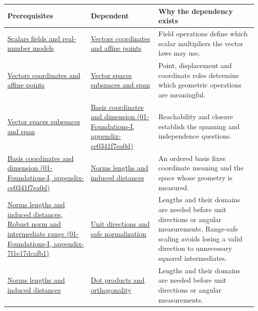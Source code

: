 {\def\LTcaptype{none} %
\begin{longtable}[]{@{}
  >{\raggedright\arraybackslash}p{}
  >{\raggedright\arraybackslash}p{}
  >{\raggedright\arraybackslash}p{}@{}}
\toprule\noalign{}
\begin{minipage}[b]{\linewidth}\raggedright
Prerequisites
\end{minipage} & \begin{minipage}[b]{\linewidth}\raggedright
Dependent
\end{minipage} & \begin{minipage}[b]{\linewidth}\raggedright
Why the dependency exists
\end{minipage} \\
\midrule\noalign{}
\endhead
\bottomrule\noalign{}
\endlastfoot
\hyperref[appendix-52051ad550fe]{Scalars fields and real-number models} & \hyperref[appendix-0659864c0aa3]{Vectors coordinates and affine points} & Field operations define which scalar multipliers the vector laws may use. \\
\hyperref[appendix-0659864c0aa3]{Vectors coordinates and affine points} & \hyperref[appendix-173b52c063ae]{Vector spaces subspaces and span} & Point, displacement and coordinate roles determine which geometric operations are meaningful. \\
\hyperref[appendix-173b52c063ae]{Vector spaces subspaces and span} & \href{}{Basis coordinates and dimension (01-Foundations-I, appendix-ce0341f7ea0d)} & Reachability and closure establish the spanning and independence questions. \\
\href{}{Basis coordinates and dimension (01-Foundations-I, appendix-ce0341f7ea0d)} & \hyperref[appendix-49933872bb51]{Norms lengths and induced distances} & An ordered basis fixes coordinate meaning and the space whose geometry is measured. \\
\hyperref[appendix-49933872bb51]{Norms lengths and induced distances}, \href{}{Robust norm and intermediate range (01-Foundations-I, appendix-7f1e17dcafb1)} & \hyperref[appendix-f744e41b95b4]{Unit directions and safe normalization} & Lengths and their domains are needed before unit directions or angular measurements. Range-safe scaling avoids losing a valid direction to unnecessary squared intermediates. \\
\hyperref[appendix-49933872bb51]{Norms lengths and induced distances} & \hyperref[appendix-8bc4e8fc547c]{Dot products and orthogonality} & Lengths and their domains are needed before unit directions or angular measurements. \\

\end{longtable}}
